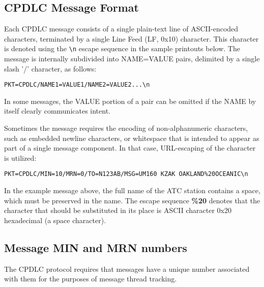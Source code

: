 \documentclass[a4paper,12pt]{article}
\begin{document}
\subsection{CPDLC Message Format}

Each CPDLC message consists of a single plain-text line of ASCII-encoded
characters, terminated by a single Line Feed (LF, 0x10) character. This
character is denoted using the \texttt{\textbackslash n} escape sequence
in the sample printouts below. The message is internally subdivided into
NAME=VALUE pairs, delimited by a single slash '/' character, as follows:

\begin{verbatim}
PKT=CPDLC/NAME1=VALUE1/NAME2=VALUE2...\n
\end{verbatim}

\noindent In some messages, the VALUE portion of a pair can be omitted if
the NAME by itself clearly communicates intent.

Sometimes the message requires the encoding of non-alphanumeric
characters, such as embedded newline characters, or whitespace that
is intended to appear as part of a single message component. In that
case, URL-escaping of the character is utilized:

\begin{verbatim}
PKT=CPDLC/MIN=10/MRN=0/TO=N123AB/MSG=UM160 KZAK OAKLAND%20OCEANIC\n
\end{verbatim}

\noindent In the example message above, the full name of the ATC station
contains a space, which must be preserved in the name. The escape
sequence \textbf{\%20} denotes that the character that should be
substituted in its place is ASCII character 0x20 hexadecimal (a space
character).

\subsection{Message MIN and MRN numbers}
\label{MinMrn}

The CPDLC protocol requires that messages have a unique number associated
with them for the purposes of message thread tracking.
\end{document}
